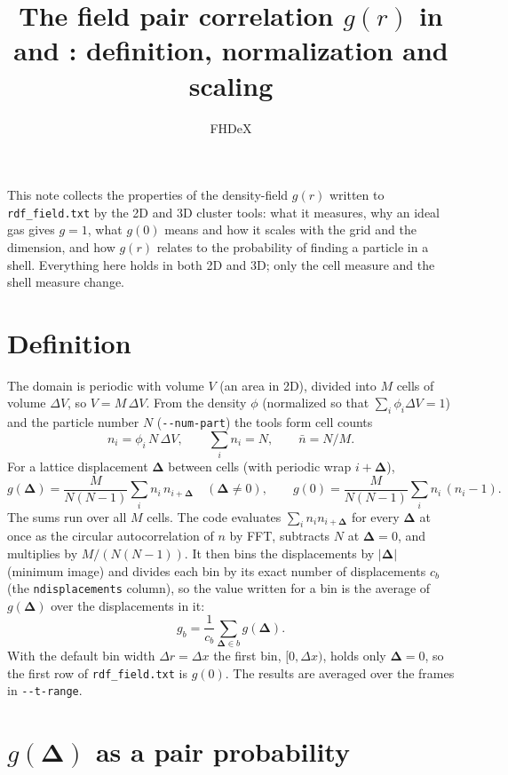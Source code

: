 \documentclass[11pt]{article}
\title{The field pair correlation $g(r)$ in \code{cluster\_diagnostics.py}\\
and \code{cluster\_diagnostics\_3d.py}: definition, normalization and scaling}
\author{FHDeX}
\date{}
\newcommand{\code}[1]{\texttt{#1}}
\newcommand{\bD}{\boldsymbol{\Delta}}
\newcommand{\nb}{\bar n}
\begin{document}
\maketitle

\noindent This note collects the properties of the density-field $g(r)$ written
to \code{rdf\_field.txt} by the 2D and 3D cluster tools: what it measures, why
an ideal gas gives $g=1$, what $g(0)$ means and how it scales with the grid and
the dimension, and how $g(r)$ relates to the probability of finding a particle
in a shell. Everything here holds in both 2D and 3D; only the cell measure and
the shell measure change.

\section{Definition}

The domain is periodic with volume $V$ (an area in 2D), divided into $M$ cells
of volume $\Delta V$, so $V=M\,\Delta V$. From the density $\phi$ (normalized
so that $\sum_i\phi_i\Delta V=1$) and the particle number $N$
(\code{-{}-num-part}) the tools form cell counts
\begin{equation}
  n_i = \phi_i\,N\,\Delta V ,\qquad \sum_i n_i = N ,\qquad \nb = N/M .
\end{equation}
For a lattice displacement $\bD$ between cells (with periodic wrap $i+\bD$),
\begin{equation}
  g(\bD) = \frac{M}{N(N-1)}\sum_i n_i\,n_{i+\bD} \quad(\bD\ne0),\qquad
  g(0) = \frac{M}{N(N-1)}\sum_i n_i\,(n_i-1) .
  \label{eq:def}
\end{equation}
The sums run over all $M$ cells. The code evaluates $\sum_i n_in_{i+\bD}$ for
every $\bD$ at once as the circular autocorrelation of $n$ by FFT, subtracts
$N$ at $\bD=0$, and multiplies by $M/(N(N-1))$. It then bins the
displacements by $|\bD|$ (minimum image) and divides each bin by its exact
number of displacements $c_b$ (the \code{ndisplacements} column), so the value
written for a bin is the average of $g(\bD)$ over the displacements in it:
\begin{equation}
  g_b = \frac1{c_b}\sum_{\bD\in b} g(\bD) .
\end{equation}
With the default bin width $\Delta r=\Delta x$ the first bin, $[0,\Delta x)$,
holds only $\bD=0$, so the first row of \code{rdf\_field.txt} is $g(0)$.
The results are averaged over the frames in \code{-{}-t-range}.

\section{\texorpdfstring{$g(\bD)$ as a pair probability}{g as a pair probability}}
\end{document}
